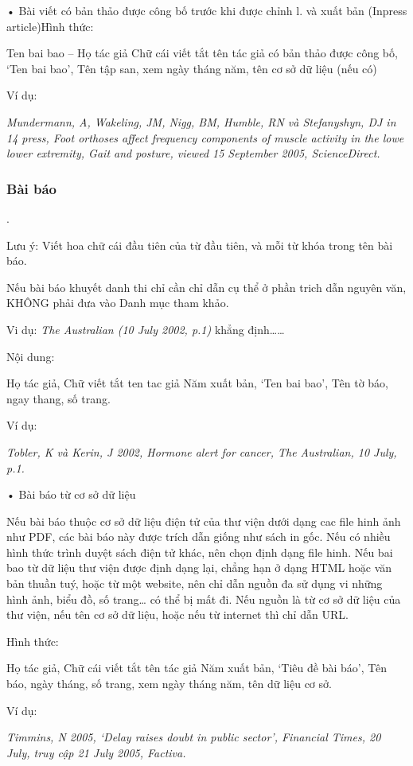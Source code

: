 \documentclass{hcmutarticle}
\begin{document}
•	Bài viết có bản thảo được công bố trước khi được chỉnh l. và xuất bản (Inpress article)Hình thức:

Ten bai bao – Họ tác giả Chữ cái viết tắt tên tác giả có bản thảo được công bố, ‘Ten bai bao’, Tên tập san, xem ngày tháng năm, tên cơ sở dữ liệu (nếu có)

Ví dụ:

{\em Mundermann, A, Wakeling, JM, Nigg, BM, Humble, RN và Stefanyshyn, DJ in 14 press, Foot orthoses affect frequency components of muscle activity in the lowe lower extremity, Gait and posture, viewed 15 September 2005, ScienceDirect.}

\subsubsection{	Bài báo}.

Lưu ý: Viết hoa chữ cái đầu tiên của từ đầu tiên, và mỗi từ khóa trong tên bài báo.

Nếu bài báo khuyết danh thi chỉ cần chỉ dẫn cụ thể ở phần trich dẫn nguyên văn,
KHÔNG phải đưa vào Danh mục tham khảo.


Vi dụ: {\em The Australian (10 July 2002, p.1)} khẳng định……

Nội dung:

Họ tác giả, Chữ viết tắt ten tac giả Năm xuất bản, ‘Ten bai bao’, Tên tờ báo, ngay
thang, số trang.

Ví dụ:

{\em Tobler, K và Kerin, J 2002, Hormone alert for cancer, The Australian, 10 July, p.1.}

•	Bài báo từ cơ sở dữ liệu

Nếu bài báo thuộc cơ sở dữ liệu điện tử của thư viện dưới dạng cac file hinh ảnh như PDF, các bài báo này được trích dẫn giống như sách in gốc. Nếu có nhiều hình thức trình duyệt sách điện tử khác, nên chọn định dạng file hinh. Nếu bai bao từ dữ liệu thư viện được định dạng lại, chẳng hạn ở dạng HTML hoặc văn bản thuần tuý, hoặc từ một website, nên chỉ dẫn nguồn đa sử dụng vi những hình ảnh, biểu đồ, số trang… có thể bị mất đi. Nếu nguồn là từ cơ sở dữ liệu của thư viện, nếu tên cơ sở dữ liệu, hoặc nếu từ internet thì chỉ dẫn URL.

Hình thức:

Họ tác giả, Chữ cái viết tắt tên tác giả Năm xuất bản, ‘Tiêu đề bài báo’, Tên báo, ngày tháng, số trang, xem ngày tháng năm, tên dữ liệu cơ sở.

Ví dụ:

{\em Timmins, N 2005, ‘Delay raises doubt in public sector’, Financial Times, 20 July, truy cập 21 July 2005, Factiva.}
\end{document}
